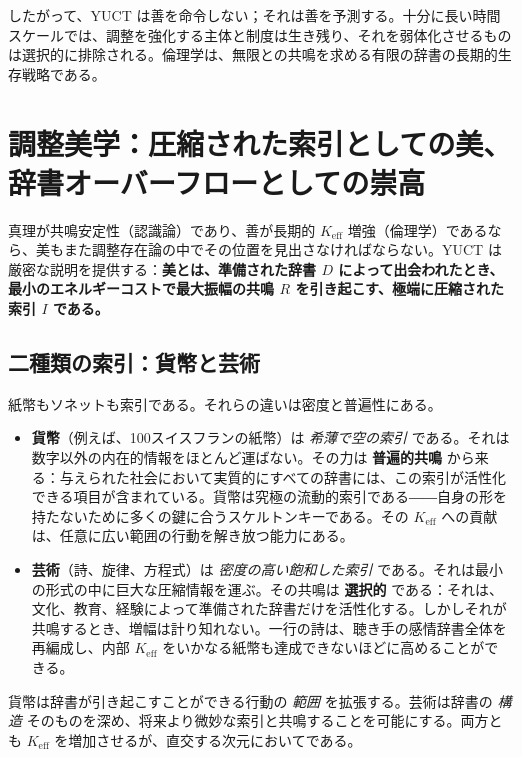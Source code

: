 \documentclass[12pt,a4paper]{article}
\begin{document}
	したがって、YUCT は善を命令しない；それは善を予測する。十分に長い時間スケールでは、調整を強化する主体と制度は生き残り、それを弱体化させるものは選択的に排除される。倫理学は、無限との共鳴を求める有限の辞書の長期的生存戦略である。
	
	\section{調整美学：圧縮された索引としての美、辞書オーバーフローとしての崇高}
	\label{sec:coordination-aesthetics}
	
	真理が共鳴安定性（認識論）であり、善が長期的 \(K_{\mathrm{eff}}\) 増強（倫理学）であるなら、美もまた調整存在論の中でその位置を見出さなければならない。YUCT は厳密な説明を提供する：\textbf{美とは、準備された辞書 \(D\) によって出会われたとき、最小のエネルギーコストで最大振幅の共鳴 \(R\) を引き起こす、極端に圧縮された索引 \(I\) である。}
	
	\subsection{二種類の索引：貨幣と芸術}
	
	紙幣もソネットも索引である。それらの違いは密度と普遍性にある。
	
	\begin{itemize}[leftmargin=*]
		\item \textbf{貨幣}（例えば、100スイスフランの紙幣）は \emph{希薄で空の索引} である。それは数字以外の内在的情報をほとんど運ばない。その力は \textbf{普遍的共鳴} から来る：与えられた社会において実質的にすべての辞書には、この索引が活性化できる項目が含まれている。貨幣は究極の流動的索引である――自身の形を持たないために多くの鍵に合うスケルトンキーである。その \(K_{\mathrm{eff}}\) への貢献は、任意に広い範囲の行動を解き放つ能力にある。
		\item \textbf{芸術}（詩、旋律、方程式）は \emph{密度の高い飽和した索引} である。それは最小の形式の中に巨大な圧縮情報を運ぶ。その共鳴は \textbf{選択的} である：それは、文化、教育、経験によって準備された辞書だけを活性化する。しかしそれが共鳴するとき、増幅は計り知れない。一行の詩は、聴き手の感情辞書全体を再編成し、内部 \(K_{\mathrm{eff}}\) をいかなる紙幣も達成できないほどに高めることができる。
	\end{itemize}
	
	貨幣は辞書が引き起こすことができる行動の \emph{範囲} を拡張する。芸術は辞書の \emph{構造} そのものを深め、将来より微妙な索引と共鳴することを可能にする。両方とも \(K_{\mathrm{eff}}\) を増加させるが、直交する次元においてである。
	
\end{document}
